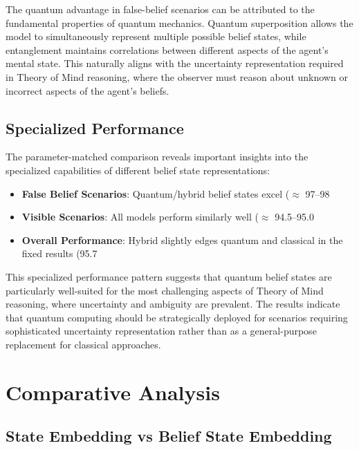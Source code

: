 \documentclass[11pt]{article}
\begin{document}
The quantum advantage in false-belief scenarios can be attributed to the fundamental properties of quantum mechanics. Quantum superposition allows the model to simultaneously represent multiple possible belief states, while entanglement maintains correlations between different aspects of the agent's mental state. This naturally aligns with the uncertainty representation required in Theory of Mind reasoning, where the observer must reason about unknown or incorrect aspects of the agent's beliefs.

\subsection{Specialized Performance}

The parameter-matched comparison reveals important insights into the specialized capabilities of different belief state representations:

\begin{itemize}
    \item \textbf{False Belief Scenarios}: Quantum/hybrid belief states excel (\(\approx\) 97--98%
    \item \textbf{Visible Scenarios}: All models perform similarly well (\(\approx\) 94.5--95.0%
    \item \textbf{Overall Performance}: Hybrid slightly edges quantum and classical in the fixed results (95.7%
\end{itemize}

This specialized performance pattern suggests that quantum belief states are particularly well-suited for the most challenging aspects of Theory of Mind reasoning, where uncertainty and ambiguity are prevalent. The results indicate that quantum computing should be strategically deployed for scenarios requiring sophisticated uncertainty representation rather than as a general-purpose replacement for classical approaches.

\section{Comparative Analysis}

\subsection{State Embedding vs Belief State Embedding}
\end{document}
